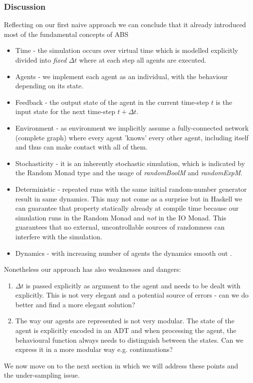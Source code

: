 \subsubsection{Discussion}
Reflecting on our first naive approach we can conclude that it already introduced most of the fundamental concepts of ABS
\begin{itemize}
	\item Time - the simulation occurs over virtual time which is modelled explicitly divided into \textit{fixed} $\Delta t$ where at each step all agents are executed.
	\item Agents - we implement each agent as an individual, with the behaviour depending on its state.
	\item Feedback - the output state of the agent in the current time-step $t$ is the input state for the next time-step $t + \Delta t$.
	\item Environment - as environment we implicitly assume a fully-connected network (complete graph) where every agent 'knows' every other agent, including itself and thus can make contact with all of them.
	\item Stochasticity - it is an inherently stochastic simulation, which is indicated by the Random Monad type and the usage of \textit{randomBoolM} and \textit{randomExpM}.
	\item Deterministic - repeated runs with the same initial random-number generator result in same dynamics. This may not come as a surprise but in Haskell we can guarantee that property statically already at compile time because our simulation runs in the Random Monad and \textit{not} in the IO Monad. This guarantees that no external, uncontrollable sources of randomness can interfere with the simulation.
	\item Dynamics - with increasing number of agents the dynamics smooth out \cite{macal_agent-based_2010}.
\end{itemize}

Nonetheless our approach has also weaknesses and dangers:
\begin{enumerate}
	\item $\Delta t$ is passed explicitly as argument to the agent and needs to be dealt with explicitly. This is not very elegant and a potential source of errors - can we do better and find a more elegant solution? 
	\item The way our agents are represented is not very modular. The state of the agent is explicitly encoded in an ADT and when processing the agent, the behavioural function always needs to distinguish between the states. Can we express it in a more modular way e.g. continuations?
\end{enumerate}

We now move on to the next section in which we will address these points and the under-sampling issue.